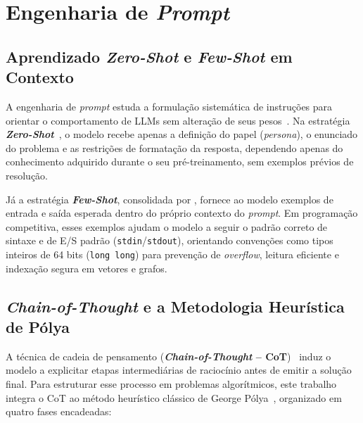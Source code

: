 \section{Engenharia de \texorpdfstring{\textit{Prompt}}{Prompt}}\label{sec:fund-prompt}

\subsection{Aprendizado \textit{Zero-Shot} e \textit{Few-Shot} em Contexto}\label{sec:fund-fewshot}

A engenharia de \textit{prompt} estuda a formulação sistemática de instruções para orientar o comportamento de LLMs sem alteração de seus pesos~\citep{dair2025prompt}. Na estratégia \textbf{\textit{Zero-Shot}}~\citep{wei2021finetuned}, o modelo recebe apenas a definição do papel (\textit{persona}), o enunciado do problema e as restrições de formatação da resposta, dependendo apenas do conhecimento adquirido durante o seu pré-treinamento, sem exemplos prévios de resolução.

Já a estratégia \textbf{\textit{Few-Shot}}, consolidada por \citet{brown2020language}, fornece ao modelo exemplos de entrada e saída esperada dentro do próprio contexto do \textit{prompt}. Em programação competitiva, esses exemplos ajudam o modelo a seguir o padrão correto de sintaxe e de E/S padrão (\texttt{stdin}/\texttt{stdout}), orientando convenções como tipos inteiros de 64 bits (\texttt{long long}) para prevenção de \textit{overflow}, leitura eficiente e indexação segura em vetores e grafos.

\subsection{\textit{Chain-of-Thought} e a Metodologia Heurística de Pólya}\label{sec:fund-polya}

A técnica de cadeia de pensamento (\textbf{\textit{Chain-of-Thought} -- CoT})~\citep{wei2022chain} induz o modelo a explicitar etapas intermediárias de raciocínio antes de emitir a solução final. Para estruturar esse processo em problemas algorítmicos, este trabalho integra o CoT ao método heurístico clássico de George Pólya~\citep{polya1945}, organizado em quatro fases encadeadas:

